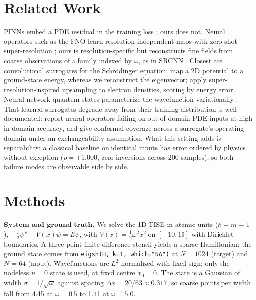 \documentclass{article}
\begin{document}
\section{Related Work}

PINNs embed a PDE residual in the training loss \citep{raissi2019}; ours does
not. Neural operators such as the FNO learn resolution-independent maps with
zero-shot super-resolution \citep{li2021fno}; ours is resolution-specific but
reconstructs fine fields from coarse observations of a family indexed by
$\omega$, as in SRCNN \citep{dong2016}. Closest are convolutional surrogates for
the Schr\"odinger equation: \citet{mills2017} map a 2D potential to a
ground-state energy, whereas we reconstruct the eigenvector; \citet{li2025} apply
super-resolution-inspired upsampling to electron densities, scoring by energy
error. Neural-network quantum states parameterize the wavefunction variationally
\citep{carleo2017}. That learned surrogates degrade away from their training
distribution is well documented: \citet{mouli2024} report neural operators
failing on out-of-domain PDE inputs at high in-domain accuracy, and
\citet{gopakumar2026} give conformal coverage across a surrogate's operating
domain under an exchangeability assumption. What this setting adds is
separability: a classical baseline on identical inputs has error ordered by
physics without exception ($\rho = +1.000$, zero inversions across 200 samples),
so both failure modes are observable side by side.

\section{Methods}

\textbf{System and ground truth.} We solve the 1D TISE in atomic units
($\hbar = m = 1$), $-\tfrac{1}{2}\psi'' + V(x)\psi = E\psi$, with
$V(x) = \tfrac{1}{2}\omega^{2}x^{2}$ on $[-10, 10]$ with Dirichlet boundaries. A
three-point finite-difference stencil yields a sparse Hamiltonian; the ground
state comes from \texttt{eigsh(H, k=1, which="SA")} at $N = 1024$ (target) and
$N = 64$ (input). Wavefunctions are $L^{2}$-normalized with fixed sign; only the
nodeless $n = 0$ state is used, at fixed centre $x_{0} = 0$. The state is a Gaussian of width $\sigma = 1/\sqrt{\omega}$
against spacing $\Delta x = 20/63 \approx 0.317$, so coarse points per width fall
from 4.45 at $\omega = 0.5$ to 1.41 at $\omega = 5.0$.
\end{document}
